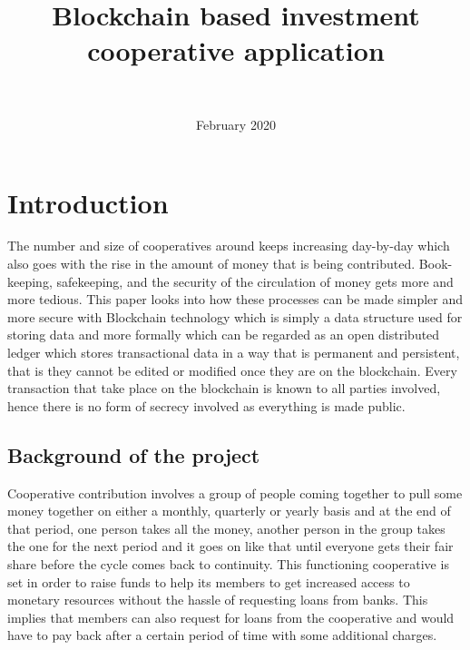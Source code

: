 \documentclass{article}
\begin{document}
\title{Blockchain based investment cooperative application}
\author{\\
}
\date{February 2020}

\maketitle

\section{Introduction}
The number and size of cooperatives around keeps increasing day-by-day which also goes with the rise in the amount of money that is being contributed. Book-keeping, safekeeping, and the security of the circulation of money gets more and more tedious. This paper looks into how these processes can be made simpler and more secure with Blockchain technology which is simply a data structure used for storing data and more formally which can be regarded as an open distributed ledger which stores transactional data in a way that is permanent and persistent, that is they cannot be edited or modified once they are on the blockchain. Every transaction that take place on the blockchain is known to all parties involved, hence there is no form of secrecy involved as everything is made public.

\subsection{Background of the project}
Cooperative contribution involves a group of people coming together to pull some money together on either a monthly, quarterly or yearly basis and at the end of that period, one person takes all the money, another person in the group takes the one for the next period and it goes on like that until everyone gets their fair share before the cycle comes back to continuity. This functioning cooperative is set in order to raise funds to help its members to get increased access to monetary resources without the hassle of requesting loans from banks. This implies that members can also request for loans from the cooperative and would have to pay back after a certain period of time with some additional charges.
\end{document}
